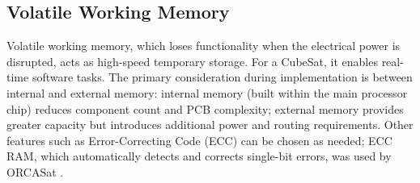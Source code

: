 \documentclass[10pt]{../datasheet}
\let\cite\citep
\begin{document}
\renewcommand{\arraystretch}{1.25}

\subsection*{Volatile Working Memory}

Volatile working memory, which loses functionality when the electrical power is disrupted, acts as high-speed temporary storage. For a CubeSat, it enables real-time software tasks. The primary consideration during implementation is between internal and external memory: internal memory (built within the main processor chip) reduces component count and PCB complexity; external memory provides greater capacity but introduces additional power and routing requirements. Other features such as Error-Correcting Code (ECC) can be chosen as needed; ECC RAM, which automatically detects and corrects single-bit errors, was used by ORCASat \cite{orcasat_obc_ds}.
\end{document}
